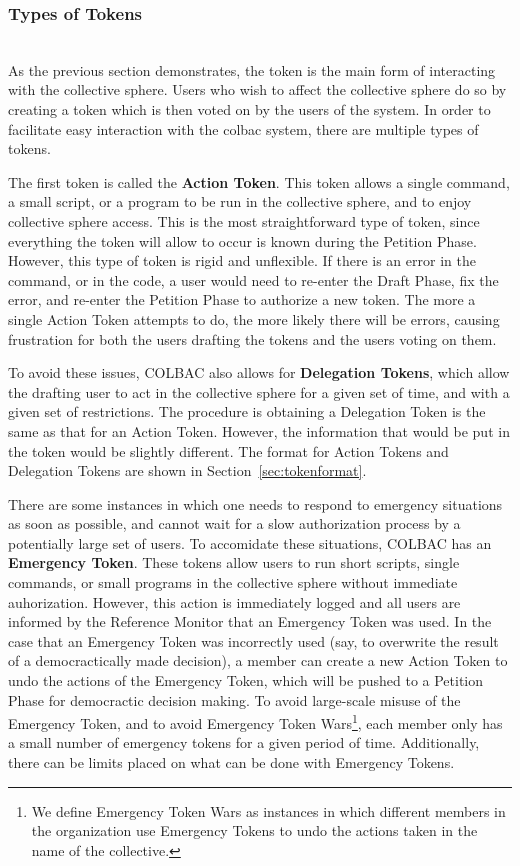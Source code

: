 \subsubsection{Types of Tokens}
\label{sec:tokentypes}
\mbox{}\\
As the previous section demonstrates, the token is the main form of interacting
with the collective sphere. Users who wish to affect the collective sphere do
so by creating a token which is then voted on by the users of the system. In
order to facilitate easy interaction with the colbac system, there are multiple
types of tokens.

The first token is called the \textbf{Action Token}. This token allows a single
command, a small script, or a program to be run in the collective sphere, and to
enjoy collective sphere access. This is the most straightforward type of token,
since everything the token will allow to occur is known during the Petition
Phase. However, this type of token is rigid and unflexible. If there is an error
in the command, or in the code, a user would need to re-enter the Draft Phase,
fix the error, and re-enter the Petition Phase to authorize a new token. The
more a single Action Token attempts to do, the more likely there will be errors,
causing frustration for both the users drafting the tokens and the users voting
on them.

To avoid these issues, COLBAC also allows for \textbf{Delegation Tokens}, which
allow the drafting user to act in the collective sphere for a given set of time,
and with a given set of restrictions. The procedure is obtaining a Delegation
Token is the same as that for an Action Token. However, the information that
would be put in the token would be slightly different. The format for Action
Tokens and Delegation Tokens are shown in Section~\ref{sec:tokenformat}.

There are some instances in which one needs to respond to emergency situations
as soon as possible, and cannot wait for a slow authorization process by a
potentially large set of users. To accomidate these situations, COLBAC has an
\textbf{Emergency Token}. These tokens allow users to run short scripts, single
commands, or small programs in the collective sphere without immediate
auhorization. However, this action is immediately logged and all users are
informed by the Reference Monitor that an Emergency Token was used. In the case
that an Emergency Token was incorrectly used (say, to overwrite the result of
a democractically made decision), a member can create a new Action Token to
undo the actions of the Emergency Token, which will be pushed to a Petition
Phase for democractic decision making. To avoid large-scale misuse of the
Emergency Token, and to avoid Emergency Token Wars\footnote{We define Emergency
Token Wars as instances in which different members in the organization use
Emergency Tokens to undo the actions taken in the name of the collective.},
each member only has a small number of emergency tokens for a given period of
time. Additionally, there can be limits placed on what can be done with 
Emergency Tokens.

